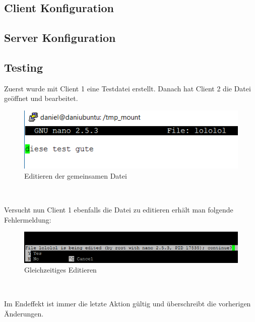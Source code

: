 \subsection{Client Konfiguration}
\subsection{Server Konfiguration}
\subsection{Testing}
Zuerst wurde mit Client 1 eine Testdatei erstellt. Danach hat Client 2 die Datei geöffnet und bearbeitet.
\begin{figure}[!h]
	\begin{center}
		\includegraphics[width=0.5\linewidth]{images/edit.png}
		\caption{Editieren der gemeinsamen Datei}
		\label{edit}
	\end{center}
\end{figure}\

Versucht nun Client 1 ebenfalls die Datei zu editieren erhält man folgende Fehlermeldung:
\begin{figure}[!h]
	\begin{center}
		\includegraphics[width=0.8\linewidth]{images/error.png}
		\caption{Gleichzeitiges Editieren}
		\label{error}
	\end{center}
\end{figure}\

Im Endeffekt ist immer die letzte Aktion gültig und überschreibt die vorherigen Änderungen.